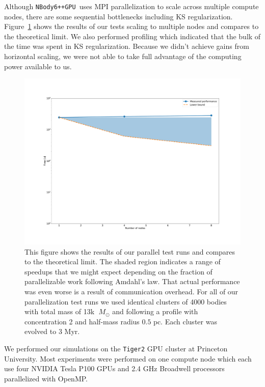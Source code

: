\documentclass{princeton_astro_thesis}
\newcommand\Msun{\; M_\odot}
\newcommand\pc{\mbox{ pc}}
\newcommand\nbody{\texttt{NBody6++GPU }}
\numberwithin{equation}{section}
\begin{document}
Although \nbody uses MPI parallelization to scale across multiple compute nodes, there are some sequential bottlenecks including KS regularization. Figure~\ref{fig:parallelperf} shows the results of our tests scaling to multiple nodes and compares to the theoretical limit.  We also performed profiling which indicated that the bulk of the time was spent in KS regularization. Because we didn't achieve gains from horizontal scaling, we were not able to take full advantage of the computing power available to us.
\begin{figure}
\centering
\includegraphics[width=\textwidth]{parallelperformance}
\caption{This figure shows the results of our parallel test runs and compares to the theoretical limit.  The shaded region indicates a range of speedups that we might expect depending on the fraction of parallelizable work following Amdahl's law.  That actual performance was even worse is a result of communication overhead. For all of our parallelization test runs we used identical clusters of 4000 bodies with total mass of 13k $\Msun$ and following a \citet{1966King} profile with concentration 2 and half-mass radius $0.5 \pc$.  Each cluster was evolved to 3 Myr.}
\label{fig:parallelperf}
\end{figure}

We performed our simulations on the \texttt{Tiger2} GPU cluster at Princeton University. Most experiments were performed on one compute node which each use four NVIDIA Tesla P100 GPUs and 2.4 GHz Broadwell processors parallelized with OpenMP.
\end{document}
